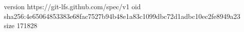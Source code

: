 version https://git-lfs.github.com/spec/v1
oid sha256:4e65064853383e68fac7527b94b48e1a83c1099dbc72d1adbc10ec2fe8949a23
size 171828
